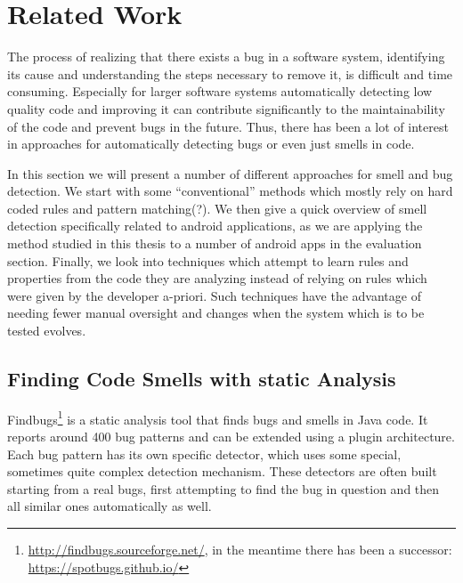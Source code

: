 \chapter{Related Work}


The process of realizing that there exists a bug in a software system, identifying its cause and understanding the steps necessary to remove it, is difficult and time consuming.
Especially for larger software systems automatically detecting low quality code and improving it can contribute significantly to the maintainability of the code and prevent bugs in the future.
Thus, there has been a lot of interest in approaches for automatically detecting bugs or even just smells in code.

In this section we will present a number of different approaches for smell and bug detection.
We start with some ``conventional'' methods which mostly rely on hard coded rules and pattern matching(?).
We then give a quick overview of smell detection specifically related to android applications, as we are applying the method studied in this thesis to a number of android apps in the evaluation section.
Finally, we look into techniques which attempt to learn rules and properties from the code they are analyzing instead of relying on rules which were given by the developer a-priori.
Such techniques have the advantage of needing fewer manual oversight and changes when the system which is to be tested evolves.

\section{Finding Code Smells with static Analysis}

Findbugs\footnote{\url{http://findbugs.sourceforge.net/}, in the meantime there has been a successor: \url{https://spotbugs.github.io/}} is a static analysis tool that finds bugs and smells in Java code.
It reports around 400 bug patterns and can be extended using a plugin architecture.
Each bug pattern has its own specific detector, which uses some special, sometimes quite complex detection mechanism.
These detectors are often built starting from a real bugs, first attempting to find the bug in question and then all similar ones automatically as well.

